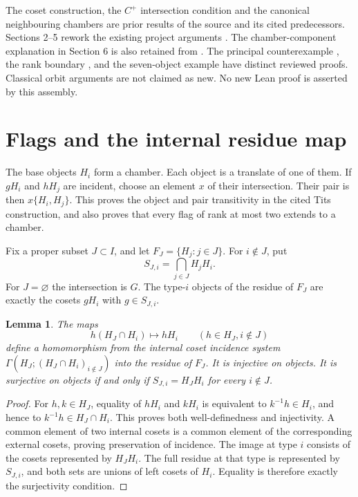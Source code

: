 \documentclass[11pt]{article}
\newtheorem{lemma}[theorem]{Lemma}
\begin{document}
The coset construction, the $C^+$ intersection condition and the
canonical neighbouring chambers are prior results of the source and
its cited predecessors. Sections 2--5 rework the existing project
arguments \cite{IC,CC}. The chamber-component explanation in Section 6
is also retained from \cite{CC}. The principal counterexample
\cite{CE}, the rank boundary \cite{PB}, and the seven-object example
\cite{CF} have distinct reviewed proofs. Classical orbit arguments are
not claimed as new. No new Lean proof is asserted by this assembly.

\section{Flags and the internal residue map}
The base objects $H_i$ form a chamber. Each object is a translate of
one of them. If $gH_i$ and $hH_j$ are incident, choose an element $x$
of their intersection. Their pair is then $x\{H_i,H_j\}$. This proves
the object and pair transitivity in the cited Tits construction, and
also proves that every flag of rank at most two extends to a chamber.

Fix a proper subset $J\subset I$, and let $F_J=\{H_j:j\in J\}$.
For $i\notin J$, put
\[
 S_{J,i}=\bigcap_{j\in J}H_jH_i.
\]
For $J=\varnothing$ the intersection is $G$. The type-$i$ objects
of the residue of $F_J$ are exactly the cosets $gH_i$ with
$g\in S_{J,i}$.

\begin{lemma}\label{internal}
The maps
\[
 h(H_J\cap H_i)\longmapsto hH_i\qquad(h\in H_J, i\notin J)
 \tag{1}
\]
define a homomorphism from the internal coset incidence system
$\Gamma(H_J;(H_J\cap H_i)_{i\notin J})$ into the residue of $F_J$.
It is injective on objects. It is surjective on objects if and only if
$S_{J,i}=H_JH_i$ for every $i\notin J$.
\end{lemma}
\begin{proof}
For $h,k\in H_J$, equality of $hH_i$ and $kH_i$ is equivalent to
$k^{-1}h\in H_i$, and hence to $k^{-1}h\in H_J\cap H_i$.
This proves both well-definedness and injectivity. A common element
of two internal cosets is a common element of the corresponding
external cosets, proving preservation of incidence. The image at
type $i$ consists of the cosets represented by $H_JH_i$. The full
residue at that type is represented by $S_{J,i}$, and both sets are
unions of left cosets of $H_i$. Equality is therefore exactly the
surjectivity condition.
\end{proof}
\end{document}
